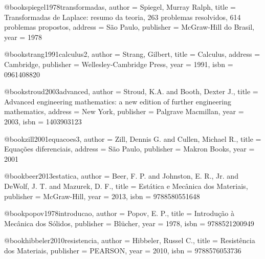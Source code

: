 @book{spiegel1978transformadas,
  author = {Spiegel, Murray Ralph},
  title = {Transformadas de Laplace: resumo da teoria, 263 problemas resolvidos, 614 problemas propostos},
  address = {São Paulo},
  publisher = {McGraw-Hill do Brasil},
  year = {1978}
}

@book{strang1991calculus2,
  author = {Strang, Gilbert},
  title = {Calculus},
  address = {Cambridge},
  publisher = {Wellesley-Cambridge Press},
  year = {1991},
  isbn = {0961408820}
}

@book{stroud2003advanced,
  author = {Stroud, K.A. and Booth, Dexter J.},
  title = {Advanced engineering mathematics: a new edition of further engineering mathematics},
  address = {New York},
  publisher = {Palgrave Macmillan},
  year = {2003},
  isbn = {1403903123}
}

@book{zill2001equacoes3,
  author = {Zill, Dennis G. and Cullen, Michael R.},
  title = {Equações diferenciais},
  address = {São Paulo},
  publisher = {Makron Books},
  year = {2001}
}

%

@book{beer2013estatica,
  author = {Beer, F. P. and Johnston, E. R., Jr. and DeWolf, J. T. and Mazurek, D. F.},
  title = {Estática e Mecânica dos Materiais},
  publisher = {McGraw-Hill},
  year = {2013},
  isbn = {9788580551648}
}

@book{popov1978introducao,
  author = {Popov, E. P.},
  title = {Introdução à Mecânica dos Sólidos},
  publisher = {Blücher},
  year = {1978},
  isbn = {9788521200949}
}

@book{hibbeler2010resistencia,
  author = {Hibbeler, Russel C.},
  title = {Resistência dos Materiais},
  publisher = {PEARSON},
  year = {2010},
  isbn = {9788576053736}
}

